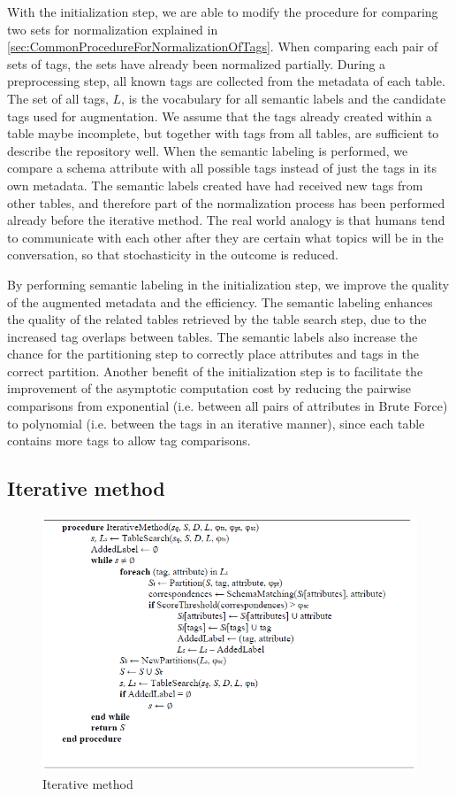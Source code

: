 With the initialization step, we are able to modify the procedure for comparing two sets for normalization explained in \autoref{sec:CommonProcedureForNormalizationOfTags}. When comparing each pair of sets of tags, the sets have already been normalized partially. During a preprocessing step, all known tags are collected from the metadata of each table. The set of all tags, $L$, is the vocabulary for all semantic labels and the candidate tags used for augmentation. We assume that the tags already created within a table maybe incomplete, but together with tags from all tables, are sufficient to describe the repository well. When the semantic labeling is performed, we compare a schema attribute with all possible tags instead of just the tags in its own metadata. The semantic labels created have had received new tags from other tables, and therefore part of the normalization process has been performed already before the iterative method. The real world analogy is that humans tend to communicate with each other after they are certain what topics will be in the conversation, so that stochasticity in the outcome is reduced.

By performing semantic labeling in the initialization step, we improve the quality of the augmented metadata and the efficiency. The semantic labeling enhances the quality of the related tables retrieved by the table search step, due to the increased tag overlaps between tables. The semantic labels also increase the chance for the partitioning step to correctly place attributes and tags in the correct partition. Another benefit of the initialization step is to facilitate the improvement of the asymptotic computation cost by reducing the pairwise comparisons from exponential (i.e. between all pairs of attributes in Brute Force) to polynomial (i.e. between the tags in an iterative manner), since each table contains more tags to allow tag comparisons.

\subsection{Iterative method}
\label{ssec:IterativeMethod}

\begin{figure}
  \centering
  \includegraphics[width=5in]{figures/iterative-method.png}
  \caption{Iterative method}
  \label{fig:iterative-method}
\end{figure}

